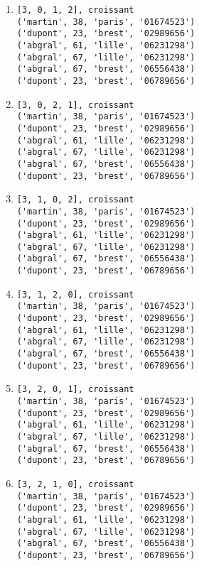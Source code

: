 \documentclass[11pt,a4paper]{article}
\begin{document}
\noindent
\begin{minipage}[t]{7cm}\footnotesize
\begin{enumerate}
\item \begin{Verbatim}
[3, 0, 1, 2], croissant
('martin', 38, 'paris', '01674523')
('dupont', 23, 'brest', '02989656')
('abgral', 61, 'lille', '06231298')
('abgral', 67, 'lille', '06231298')
('abgral', 67, 'brest', '06556438')
('dupont', 23, 'brest', '06789656')
\end{Verbatim}

\item \begin{Verbatim}
[3, 0, 2, 1], croissant
('martin', 38, 'paris', '01674523')
('dupont', 23, 'brest', '02989656')
('abgral', 61, 'lille', '06231298')
('abgral', 67, 'lille', '06231298')
('abgral', 67, 'brest', '06556438')
('dupont', 23, 'brest', '06789656')
\end{Verbatim}

\item \begin{Verbatim}
[3, 1, 0, 2], croissant
('martin', 38, 'paris', '01674523')
('dupont', 23, 'brest', '02989656')
('abgral', 61, 'lille', '06231298')
('abgral', 67, 'lille', '06231298')
('abgral', 67, 'brest', '06556438')
('dupont', 23, 'brest', '06789656')
\end{Verbatim}

\item \begin{Verbatim}
[3, 1, 2, 0], croissant
('martin', 38, 'paris', '01674523')
('dupont', 23, 'brest', '02989656')
('abgral', 61, 'lille', '06231298')
('abgral', 67, 'lille', '06231298')
('abgral', 67, 'brest', '06556438')
('dupont', 23, 'brest', '06789656')
\end{Verbatim}

\item \begin{Verbatim}
[3, 2, 0, 1], croissant
('martin', 38, 'paris', '01674523')
('dupont', 23, 'brest', '02989656')
('abgral', 61, 'lille', '06231298')
('abgral', 67, 'lille', '06231298')
('abgral', 67, 'brest', '06556438')
('dupont', 23, 'brest', '06789656')
\end{Verbatim}

\item \begin{Verbatim}
[3, 2, 1, 0], croissant
('martin', 38, 'paris', '01674523')
('dupont', 23, 'brest', '02989656')
('abgral', 61, 'lille', '06231298')
('abgral', 67, 'lille', '06231298')
('abgral', 67, 'brest', '06556438')
('dupont', 23, 'brest', '06789656')
\end{Verbatim}
\end{enumerate}
\end{minipage}
\end{document}
